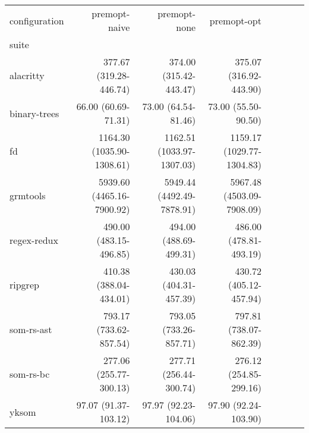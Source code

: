 \begin{tabular}{lrrrrrrr}
\toprule
configuration & premopt-naive & premopt-none & premopt-opt \\
suite &  &  &  \\
\midrule
alacritty & 377.67 \footnotesize{(319.28-446.74)} & 374.00 \footnotesize{(315.42-443.47)} & 375.07 \footnotesize{(316.92-443.90)} \\
binary-trees & 66.00 \footnotesize{(60.69-71.31)} & 73.00 \footnotesize{(64.54-81.46)} & 73.00 \footnotesize{(55.50-90.50)} \\
fd & 1164.30 \footnotesize{(1035.90-1308.61)} & 1162.51 \footnotesize{(1033.97-1307.03)} & 1159.17 \footnotesize{(1029.77-1304.83)} \\
grmtools & 5939.60 \footnotesize{(4465.16-7900.92)} & 5949.44 \footnotesize{(4492.49-7878.91)} & 5967.48 \footnotesize{(4503.09-7908.09)} \\
regex-redux & 490.00 \footnotesize{(483.15-496.85)} & 494.00 \footnotesize{(488.69-499.31)} & 486.00 \footnotesize{(478.81-493.19)} \\
ripgrep & 410.38 \footnotesize{(388.04-434.01)} & 430.03 \footnotesize{(404.31-457.39)} & 430.72 \footnotesize{(405.12-457.94)} \\
som-rs-ast & 793.17 \footnotesize{(733.62-857.54)} & 793.05 \footnotesize{(733.26-857.71)} & 797.81 \footnotesize{(738.07-862.39)} \\
som-rs-bc & 277.06 \footnotesize{(255.77-300.13)} & 277.71 \footnotesize{(256.44-300.74)} & 276.12 \footnotesize{(254.85-299.16)} \\
yksom & 97.07 \footnotesize{(91.37-103.12)} & 97.97 \footnotesize{(92.23-104.06)} & 97.90 \footnotesize{(92.24-103.90)} \\
\bottomrule
\end{tabular}
